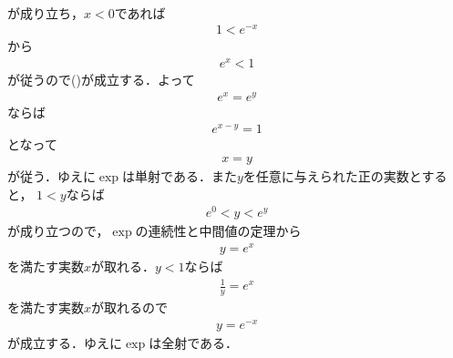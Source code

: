 \begin{sketch}
\begin{align}
		\end{align}
		が成り立ち，$x < 0$であれば
		\begin{align}
			1 < e^{-x}
		\end{align}
		から
		\begin{align}
			e^{x} < 1
		\end{align}
		が従うので()が成立する．よって
		\begin{align}
			e^x = e^y
		\end{align}
		ならば
		\begin{align}
			e^{x - y} = 1
		\end{align}
		となって
		\begin{align}
			x = y
		\end{align}
		が従う．ゆえに$\exp$は単射である．また$y$を任意に与えられた正の実数とすると，
		$1 < y$ならば
		\begin{align}
			e^{0} < y < e^{y}
		\end{align}
		が成り立つので，$\exp$の連続性と中間値の定理から
		\begin{align}
			y = e^{x}
		\end{align}
		を満たす実数$x$が取れる．$y < 1$ならば
		\begin{align}
			\frac{1}{y} = e^{x}
		\end{align}
		を満たす実数$x$が取れるので
		\begin{align}
			y = e^{-x}
		\end{align}
		が成立する．ゆえに$\exp$は全射である．
		\QED
	\end{sketch}	